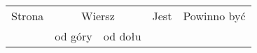 \documentclass[a4paper,11pt]{article}
\begin{document}
\begin{center}
  \begin{tabular}{|c|c|c|c|c|}
    \hline
    Strona & \multicolumn{2}{c|}{Wiersz} & Jest
                              & Powinno być \\ \cline{2-3}
    & od góry & od dołu & & \\
    \hline

\end{tabular}
\end{center}
\end{document}
